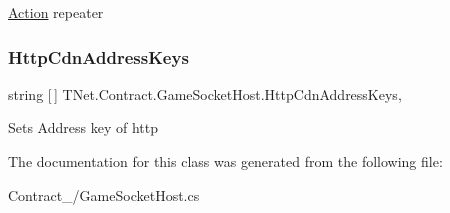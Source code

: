 \mbox{\hyperlink{namespace_t_net_1_1_contract_1_1_action}{Action}} repeater 

\mbox{\label{class_t_net_1_1_contract_1_1_game_socket_host_aa3fd8ab07e95e70d3880fd5450041458}} 
\subsubsection{\texorpdfstring{Http\+Cdn\+Address\+Keys}{HttpCdnAddressKeys}}
{\footnotesize\ttfamily string \mbox{[}$\,$\mbox{]} T\+Net.\+Contract.\+Game\+Socket\+Host.\+Http\+Cdn\+Address\+Keys\hspace{0.3cm}{\ttfamily [set]}, {\ttfamily [protected]}}



Sets Address key of http 



The documentation for this class was generated from the following file\+:\begin{DoxyCompactItemize}
\item 
Contract\+\_\+/Game\+Socket\+Host.\+cs\end{DoxyCompactItemize}
